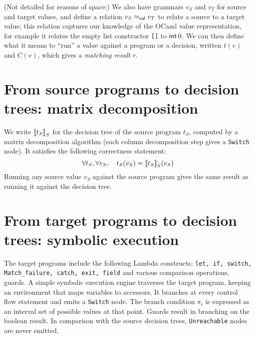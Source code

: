 \documentclass[12pt]{article}
\begin{document}
(Not detailed for reasons of space:) We also have grammars $v_S$ and
$v_T$ for source and target values, and define a relation
$v_S \mathrel{\approx_{\mathsf{val}}} v_T$ to relate a source to a target value; this
relation captures our knowledge of the OCaml value representation, for
example it relates the empty list constructor \texttt{[]} to
$\mathsf{int}\,0$. We can then define what it means to ``run'' a value against
a program or a decision, written $t(v)$ and $C(v)$, which gives
a \emph{matching result} $r$.

\section{From source programs to decision trees: matrix decomposition}

We write ${\llbracket{t_S}\rrbracket}_S$ for the decision tree of the source program
$t_S$, computed by a matrix decomposition algorithm (each column
decomposition step gives a \texttt{Switch} node).
It satisfies the following correctness statement:
\[
\forall t_S, \forall v_S, \quad t_S(v_S) = {\llbracket{t_S}\rrbracket}_S(v_S)
\]
Running any source value $v_S$ against the source program gives the
same result as running it against the decision tree.



\section{From target programs to decision trees: symbolic execution}
The target programs include the following Lambda constructs:
\texttt{let, if, switch, Match\_failure, catch, exit, field} and
various comparison operations, guards. A simple symbolic execution
engine traverses the target program, keeping an environment that maps
variables to accessors. It branches at every control flow statement
and emits a \texttt{Switch} node. The branch condition $\pi_i$ is
expressed as an interval set of possible values at that point.
%
Guards result in branching on the boolean result.
%
In comparison with the source decision trees, \texttt{Unreachable}
nodes are never emitted.
\end{document}
